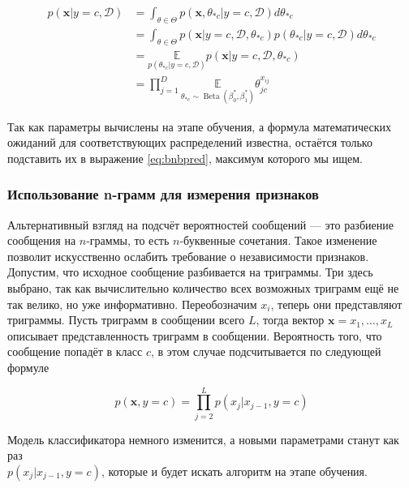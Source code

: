 \begin{align}
  p(\mathbf{x}|y=c,\mathcal{D}) &=\int_{\theta\in\Theta}p(\mathbf{x},\theta_{*c}|y=c,\mathcal{D})d\theta_{*c}\label{eq:maththeta1}\\
  &=\int_{\theta\in\Theta}p(\mathbf{x}|y=c,\mathcal{D},\theta_{*c})p(\theta_{*c}|y=c,\mathcal{D})d\theta_{*c}\label{eq:maththeta2}\\
  &=\underset{p(\theta_{*c}|y=c,\mathcal{D})} {\mathbb{E}}p(\mathbf{x}|y=c,\mathcal{D},\theta_{*c})\label{eq:maththeta2}\\
  &=\prod_{j=1}^D\underset{\theta_{*c}\sim\operatorname{Beta}(\beta_0^*,\beta_1^*)}{\mathbb{E}}\theta_{jc}^{x_{ij}}
\end{align}

Так как параметры вычислены на этапе обучения, а формула математических ожиданий для
соответствующих распределений известна, остаётся только подставить их в выражение \ref{eq:bnbpred},
максимум которого мы ищем.

\subsubsection{Использование n-грамм для измерения признаков}\label{ngram}
Альтернативный взгляд на подсчёт вероятностей сообщений --- это разбиение сообщения на $n$-граммы, то
есть $n$-буквенные сочетания. Такое изменение позволит искусственно ослабить требование о
независимости признаков. Допустим, что исходное сообщение разбивается на триграммы. Три здесь выбрано,
так как вычислительно количество всех возможных триграмм ещё не так велико, но уже информативно.
Переобозначим $x_i$, теперь они представляют триграммы. Пусть триграмм в сообщении всего $L$, тогда
вектор $\mathbf{x} = {x_1, \ldots, x_L}$ описывает представленность триграмм в сообщении.
Вероятность того, что сообщение попадёт в класс $c$, в этом случае подсчитывается по следующей формуле

\begin{equation}
  p(\mathbf{x}, y=c) = \prod_{j=2}^Lp(x_j|x_{j-1},y=c)
\end{equation}

Модель классификатора немного изменится, а новыми параметрами станут как раз\\
$p(x_j|x_{j-1},y=c)$, которые и будет искать алгоритм на этапе обучения.

